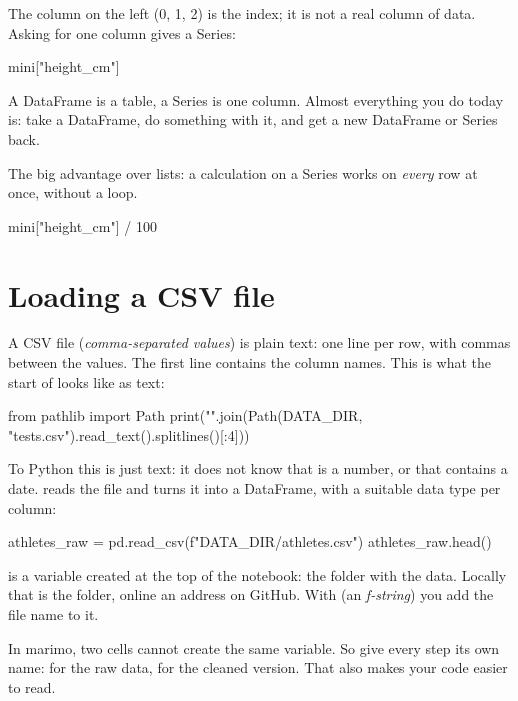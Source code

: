 \documentclass[11pt,a4paper]{article}
\begin{document}
The column on the left (0, 1, 2) is the index; it is not a real column
of data. Asking for one column gives a Series:

\begin{python}
mini["height_cm"]
\end{python}

\begin{keyidea}
A DataFrame is a table, a Series is one column. Almost everything you
do today is: take a DataFrame, do something with it, and get a new
DataFrame or Series back.
\end{keyidea}

The big advantage over lists: a calculation on a Series works on
\emph{every} row at once, without a  loop.

\begin{python}
mini["height_cm"] / 100
\end{python}

\section{Loading a CSV file}

A CSV file (\emph{comma-separated values}) is plain text: one line per
row, with commas between the values. The first line contains the column
names. This is what the start of  looks like as text:

\begin{python}[outonly]
from pathlib import Path
print("\n".join(Path(DATA_DIR, "tests.csv").read_text().splitlines()[:4]))
\end{python}

To Python this is just text: it does not know that  is a
number, or that  contains a date.  reads
the file and turns it into a DataFrame, with a suitable data type per
column:

\begin{python}
athletes_raw = pd.read_csv(f"{DATA_DIR}/athletes.csv")
athletes_raw.head()
\end{python}

 is a variable created at the top of the notebook: the
folder with the data. Locally that is the  folder, online
an address on GitHub. With  (an
\emph{f-string}) you add the file name to it.

\begin{watchout}
In marimo, two cells cannot create the same variable. So give every
step its own name:  for the raw data,
 for the cleaned version. That also makes your
code easier to read.
\end{watchout}
\end{document}
